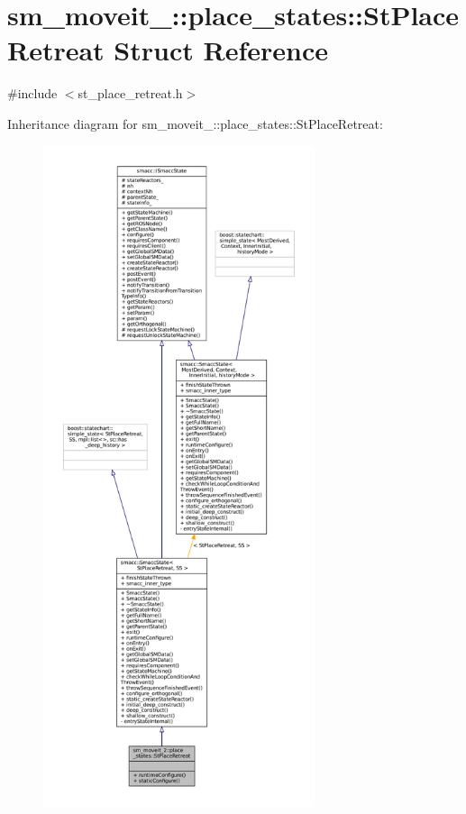 \hypertarget{structsm__moveit__2_1_1place__states_1_1StPlaceRetreat}{}\section{sm\+\_\+moveit\+\_\+:\+:place\+\_\+states\+:\+:St\+Place\+Retreat Struct Reference}
\label{structsm__moveit__2_1_1place__states_1_1StPlaceRetreat}


{\ttfamily \#include $<$st\+\_\+place\+\_\+retreat.\+h$>$}



Inheritance diagram for sm\+\_\+moveit\+\_\+:\+:place\+\_\+states\+:\+:St\+Place\+Retreat\+:
\nopagebreak
\begin{figure}[H]
\begin{center}
\leavevmode
\includegraphics[height=550pt]{structsm__moveit__2_1_1place__states_1_1StPlaceRetreat__inherit__graph}
\end{center}
\end{figure}


